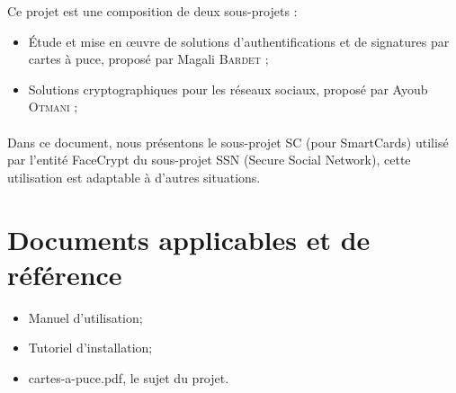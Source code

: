 \documentclass[a4paper,11pt,french]{article}
\begin{document}
Ce projet est une composition de deux sous-projets :
\begin{itemize}
    \item Étude et mise en \oe{}uvre de solutions d’authentifications et de signatures 
        par cartes à puce, proposé par Magali \textsc{Bardet} ;
\item Solutions cryptographiques pour les réseaux sociaux, proposé par Ayoub 
    \textsc{Otmani} ;
\end{itemize}

\paragraph{}
Dans ce document, nous présentons le sous-projet SC (pour SmartCards) utilisé 
par l'entité FaceCrypt du sous-projet SSN (Secure Social Network), cette
utilisation est adaptable à d'autres situations.

\section{Documents applicables et de référence}
\begin{itemize}
    \item Manuel d'utilisation;
    \item Tutoriel d'installation;
    \item cartes-a-puce.pdf, le sujet du projet.
\end{itemize}
\end{document}

